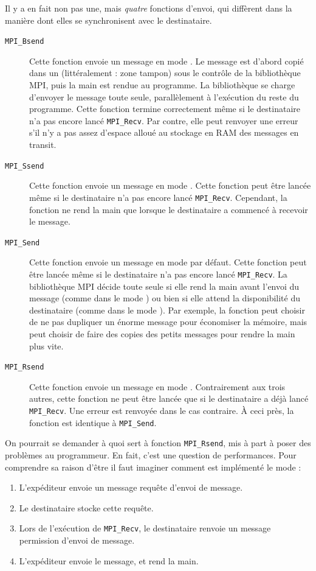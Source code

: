 Il y a en fait non pas une, mais \emph{quatre} fonctions d'envoi, qui
diffèrent dans la manière dont elles se synchronisent avec le
destinataire.

\begin{description}
\item[\texttt{MPI\_Bsend}] Cette fonction envoie un message en mode \og
  \fg. Le message est d'abord copié dans un \og
  \fg (littéralement : zone tampon) sous le contrôle
  de la bibliothèque MPI, puis la main est rendue au programme. La
  bibliothèque se charge d'envoyer le message toute seule, parallèlement
  à l'exécution du reste du programme. Cette fonction termine
  correctement même si le destinataire n'a pas encore lancé
  \texttt{MPI\_Recv}.  Par contre, elle peut renvoyer une erreur s'il
  n'y a pas assez d'espace alloué au stockage en RAM des messages \og
  en transit\fg.

\item[\texttt{MPI\_Ssend}] Cette fonction envoie un message en mode \og
  \fg. Cette fonction peut être lancée même si le
  destinataire n'a pas encore lancé \texttt{MPI\_Recv}. Cependant, la
  fonction ne rend la main que lorsque le destinataire a commencé à
  recevoir le message.

\item[\texttt{MPI\_Send}] Cette fonction envoie un message en mode \og
  par défaut\fg. Cette fonction peut être lancée même si le
  destinataire n'a pas encore lancé \texttt{MPI\_Recv}. La bibliothèque
  MPI décide toute seule si elle rend la main avant l'envoi du message
  (comme dans le mode ) ou bien si elle attend la
  disponibilité du destinataire (comme dans le mode
  ). Par exemple, la fonction peut choisir de ne
  pas dupliquer un énorme message pour économiser la mémoire, mais
  peut choisir de faire des copies des petits messages pour rendre la
  main plus vite.

\item[\texttt{MPI\_Rsend}] Cette fonction envoie un message en mode \og
   \fg. Contrairement aux trois autres, cette fonction
  ne peut être lancée que si le destinataire a déjà lancé
  \texttt{MPI\_Recv}. Une erreur est renvoyée dans le cas
  contraire. \`A ceci près, la fonction est identique à \texttt{MPI\_Send}.
\end{description}

On pourrait se demander à quoi sert à fonction \texttt{MPI\_Rsend}, mis
à part à poser des problèmes au programmeur. En fait, c'est une
question de performances. Pour comprendre sa raison d'être il faut
imaginer comment est implémenté le mode  :
\begin{enumerate}
\item L'expéditeur envoie un message \og requête d'envoi de message\fg.
\item Le destinataire stocke cette requête.
\item Lors de l'exécution de \texttt{MPI\_Recv}, le destinataire
  renvoie un message \og permission d'envoi de message\fg.
\item L'expéditeur envoie le message, et rend la main.
\end{enumerate}

